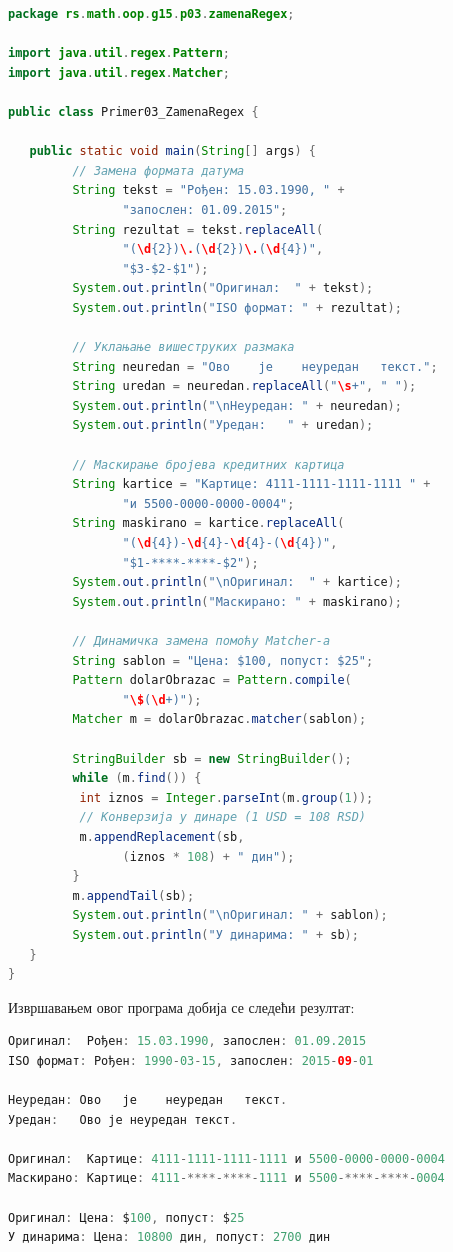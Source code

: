 \begin{lstlisting}[language=Java]
package rs.math.oop.g15.p03.zamenaRegex;
 
import java.util.regex.Pattern;
import java.util.regex.Matcher;
 
public class Primer03_ZamenaRegex {
 
   public static void main(String[] args) {
         // Замена формата датума
         String tekst = "Рођен: 15.03.1990, " +
                "запослен: 01.09.2015";
         String rezultat = tekst.replaceAll(
                "(\d{2})\.(\d{2})\.(\d{4})",
                "$3-$2-$1");
         System.out.println("Оригинал:  " + tekst);
         System.out.println("ISO формат: " + rezultat);
 
         // Уклањање вишеструких размака
         String neuredan = "Ово    је    неуредан   текст.";
         String uredan = neuredan.replaceAll("\s+", " ");
         System.out.println("\nНеуредан: " + neuredan);
         System.out.println("Уредан:   " + uredan);
 
         // Маскирање бројева кредитних картица
         String kartice = "Картице: 4111-1111-1111-1111 " +
                "и 5500-0000-0000-0004";
         String maskirano = kartice.replaceAll(
                "(\d{4})-\d{4}-\d{4}-(\d{4})",
                "$1-****-****-$2");
         System.out.println("\nОригинал:  " + kartice);
         System.out.println("Маскирано: " + maskirano);
 
         // Динамичка замена помоћу Matcher-а
         String sablon = "Цена: $100, попуст: $25";
         Pattern dolarObrazac = Pattern.compile(
                "\$(\d+)");
         Matcher m = dolarObrazac.matcher(sablon);
 
         StringBuilder sb = new StringBuilder();
         while (m.find()) {
          int iznos = Integer.parseInt(m.group(1));
          // Конверзија у динаре (1 USD = 108 RSD)
          m.appendReplacement(sb,
                (iznos * 108) + " дин");
         }
         m.appendTail(sb);
         System.out.println("\nОригинал: " + sablon);
         System.out.println("У динарима: " + sb);
   }
}
\end{lstlisting}


Извршавањем овог програма добија се следећи резултат:


\begin{lstlisting}[language=Java]
Оригинал:  Рођен: 15.03.1990, запослен: 01.09.2015
ISO формат: Рођен: 1990-03-15, запослен: 2015-09-01
 
Неуредан: Ово   је    неуредан   текст.
Уредан:   Ово је неуредан текст.
 
Оригинал:  Картице: 4111-1111-1111-1111 и 5500-0000-0000-0004
Маскирано: Картице: 4111-****-****-1111 и 5500-****-****-0004
 
Оригинал: Цена: $100, попуст: $25
У динарима: Цена: 10800 дин, попуст: 2700 дин
\end{lstlisting}


